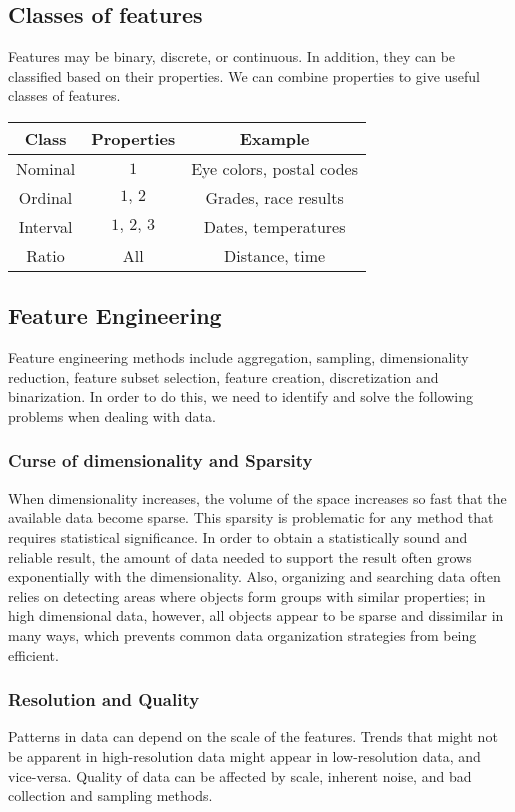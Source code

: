 \documentclass[9pt,twocolumn]{article}
\begin{document}
	\subsection*{Classes of features}
		Features may be binary, discrete, or continuous. In addition, they can be classified based on their properties. We can combine properties to give useful classes of features.

		\begin{center}
		\begin{tabular}{|c|c|c|} 
		\hline
		Class & Properties & Example\\
		\hline
		Nominal & $1$ & Eye colors, postal codes\\
		Ordinal & $1,\,2$ & Grades, race results\\
		Interval & $1,\,2,\,3$ & Dates, temperatures\\
		Ratio & All & Distance, time\\
		\hline
		\end{tabular}
		\end{center}

\subsection*{Feature Engineering}
Feature engineering methods include aggregation, sampling, dimensionality reduction, feature subset selection, feature creation, discretization and binarization. In order to do this, we need to identify and solve the following problems when dealing with data.

	\subsubsection*{Curse of dimensionality and Sparsity}
		When dimensionality increases, the volume of the space increases so fast that the available data become sparse. This sparsity is problematic for any method that requires statistical significance. In order to obtain a statistically sound and reliable result, the amount of data needed to support the result often grows exponentially with the dimensionality. Also, organizing and searching data often relies on detecting areas where objects form groups with similar properties; in high dimensional data, however, all objects appear to be sparse and dissimilar in many ways, which prevents common data organization strategies from being efficient.
	\subsubsection*{Resolution and Quality}
		Patterns in data can depend on the scale of the features. Trends that might not be apparent in high-resolution data might appear in low-resolution data, and vice-versa. Quality of data can be affected by scale, inherent noise, and bad collection and sampling methods.
\end{document}
